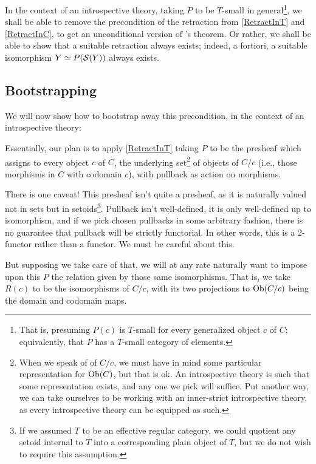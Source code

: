 In the context of an introspective theory, taking $P$ to be $T$-small in general\footnote{That is, presuming $P(c)$ is $T$-small for every generalized object $c$ of $C$; equivalently, that $P$ has a $T$-small category of elements.}, we shall be able to remove the precondition of the retraction from \cref{RetractInT} and \cref{RetractInC}, to get an unconditional version of \Loeb's theorem. Or rather, we shall be able to show that a suitable retraction always exists; indeed, a fortiori, a suitable isomorphism $Y \simeq P(\mathcal{S}(Y))$ always exists.

\subsection{Bootstrapping}
We will now show how to bootstrap away this precondition, in the context of an introspective theory:

Essentially, our plan is to apply \cref{RetractInT} taking $P$ to be the presheaf which assigns to every object $c$ of $C$, the underlying set\footnote{When we speak of  of $C/c$, we must have in mind some particular representation for $\operatorname{Ob}(C)$, but that is ok. An introspective theory is such that some representation exists, and any one we pick will suffice. Put another way, we can take ourselves to be working with an inner-strict introspective theory, as every introspective theory can be equipped as such.} of objects of $C/c$ (i.e., those morphisms in $C$ with codomain $c$), with pullback as action on morphisms.

There is one caveat! This presheaf isn't quite a presheaf, as it is naturally valued not in sets but in setoids\footnote{If we assumed $T$ to be an effective regular category, we could quotient any setoid internal to $T$ into a corresponding plain object of $T$, but we do not wish to require this assumption.}. Pullback isn't well-defined, it is only well-defined up to isomorphism, and if we pick chosen pullbacks in some arbitrary fashion, there is no guarantee that pullback will be strictly functorial. In other words, this is a 2-functor rather than a functor. We must be careful about this.


But supposing we take care of that, we will at any rate naturally want to impose upon this $P$ the relation given by those same isomorphisms. That is, we take $R(c)$ to be the isomorphisms of $C/c$, with its two projections to $\operatorname{Ob}(C/c)$ being the domain and codomain maps.

